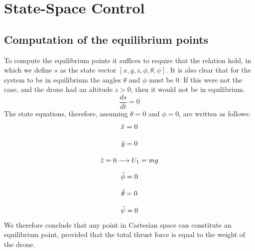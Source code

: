 \documentclass[a4paper,12pt]{article}
\begin{document}
\section{State-Space Control}
\subsection{Computation of the equilibrium points}
To compute the equilibrium points it suffices to require that the relation hold, in which we define $s$ as the state vector $[x, y, z, \phi, \theta, \psi]$. It is also clear that for the system to be in equilibrium the angles $\theta$ and $\phi$ must be 0. If this were not the case, and the drone had an altitude $z > 0$, then it would not be in equilibrium.
\begin{equation}
    \frac{ds}{dt} = 0
\end{equation}
\newline
The state equations, therefore, assuming $\theta = 0$ and $\phi = 0$, are written as follows:
\begin{equation}
    \Ddot{x} = 0
\end{equation}

\begin{equation}
    \Ddot{y} = 0
\end{equation}

\begin{equation}
    \Ddot{z} = 0 \longrightarrow U_1 = mg
\end{equation}


\begin{equation}
    \Ddot{\phi} = 0
\end{equation}

\begin{equation}
    \Ddot{\theta} = 0
\end{equation}

\begin{equation}
    \Ddot{\psi} = 0
\end{equation}
We therefore conclude that any point in Cartesian space can constitute an equilibrium point, provided that the total thrust force is equal to the weight of the drone.
\end{document}
